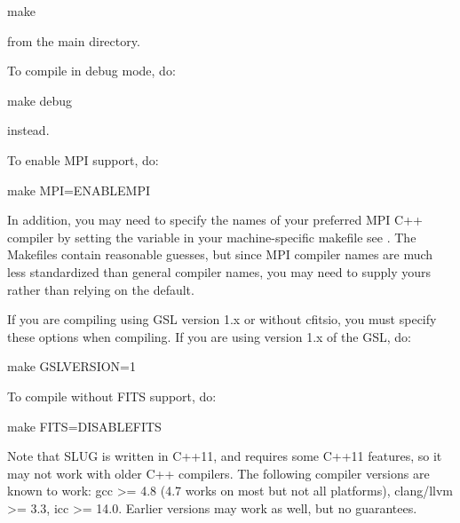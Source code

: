 \documentclass[letterpaper,10pt,english]{sphinxmanual}
\begin{document}
\begin{sphinxVerbatim}[commandchars=\\\{\}]
make
\end{sphinxVerbatim}

from the main  directory.

To compile in debug mode, do:

\begin{sphinxVerbatim}[commandchars=\\\{\}]
make debug
\end{sphinxVerbatim}

instead.

To enable MPI support, do:

\begin{sphinxVerbatim}[commandchars=\\\{\}]
make MPI=ENABLE\PYGZus{}MPI
\end{sphinxVerbatim}

In addition, you may need to specify the names of your preferred MPI
C++ compiler by setting the variable  in your
machine-specific makefile \textendash{} see {\hyperref[\detokenize{compiling:ssec-machine-makefiles}]{}}. The
Makefiles contain reasonable guesses, but since MPI compiler names are
much less standardized than general compiler names, you may need to
supply yours rather than relying on the default.

If you are compiling using GSL version 1.x or without cfitsio, you
must specify these options when compiling. If you are using version
1.x of the GSL, do:

\begin{sphinxVerbatim}[commandchars=\\\{\}]
make GSLVERSION=1
\end{sphinxVerbatim}

To compile without FITS support, do:

\begin{sphinxVerbatim}[commandchars=\\\{\}]
make FITS=DISABLE\PYGZus{}FITS
\end{sphinxVerbatim}

Note that SLUG is written in C++11, and requires some C++11 features,
so it may not work with older C++ compilers. The following compiler
versions are known to work: gcc \textgreater{}= 4.8 (4.7 works on most but not all
platforms), clang/llvm \textgreater{}= 3.3, icc \textgreater{}= 14.0. Earlier versions may work
as well, but no guarantees.
\end{document}
